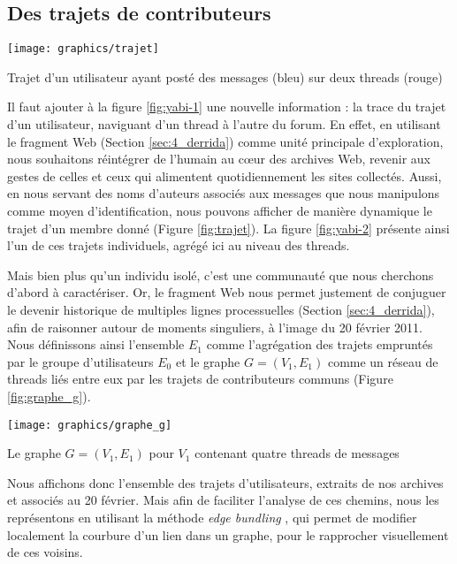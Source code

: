 \documentclass[symmetric,justified,marginals=raggedouter]{tufte-book}
\begin{document}
\subsection{Des trajets de contributeurs}

\begin{marginfigure}%
  \texttt{[image: graphics/trajet]}
  \vspace*{0.2cm}  
  \caption{Trajet d'un utilisateur ayant posté des messages (bleu) sur deux threads (rouge)}
  \label{fig:trajet}
\end{marginfigure} 

\noindent Il faut ajouter à la figure \ref{fig:yabi-1} une nouvelle information : la trace du trajet d'un utilisateur, naviguant d'un thread à l'autre du forum. En effet, en utilisant le fragment Web (Section \ref{sec:4_derrida}) comme unité principale d'exploration, nous souhaitons réintégrer de l'humain au cœur des archives Web, revenir aux gestes de celles et ceux qui alimentent quotidiennement les sites collectés. Aussi, en nous servant des noms d'auteurs associés aux messages que nous manipulons comme moyen d'identification, nous pouvons afficher de manière dynamique le trajet d'un membre donné (Figure \ref{fig:trajet}). La figure \ref{fig:yabi-2} présente ainsi l'un de ces trajets individuels, agrégé ici au niveau des threads. 

Mais bien plus qu'un individu isolé, c'est une communauté que nous cherchons d'abord à caractériser. Or, le fragment Web nous permet justement de conjuguer le devenir historique de multiples lignes processuelles (Section \ref{sec:4_derrida}), afin de raisonner autour de moments singuliers, à l'image du 20 février 2011. Nous définissons ainsi l'ensemble $E_1$ comme l'agrégation des trajets empruntés par le groupe d'utilisateurs $E_0$ et le graphe $G=(V_1,E_1)$ comme un réseau de threads liés entre eux par les trajets de contributeurs communs (Figure \ref{fig:graphe_g}). 

\begin{marginfigure}%
  \texttt{[image: graphics/graphe\_g]}
  \vspace*{0.2cm}  
  \caption{Le graphe $G=(V_1,E_1)$ pour $V_1$ contenant quatre threads de messages}
  \label{fig:graphe_g}
\end{marginfigure} 


Nous affichons donc l'ensemble des trajets d'utilisateurs, extraits de nos archives et associés au 20 février. Mais afin de faciliter l'analyse de ces chemins, nous les représentons en utilisant la méthode \textit{edge bundling} \citep{holten_hierarchical_2006}, qui permet de modifier localement la courbure d'un lien dans un graphe, pour le rapprocher visuellement de ces voisins. 
\end{document}
